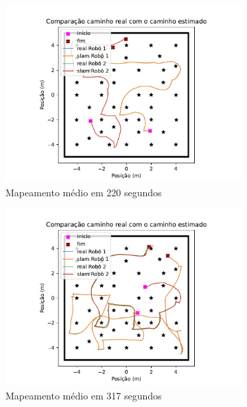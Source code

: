 \begin{figure}
  \begin{subfigure}{0.49\textwidth}
    \includegraphics[width=\textwidth]{figs/two-agents/robots-path-best-time.pdf} 
    \caption{Mapeamento médio em 220 segundos}
    \label{fig:two-agent-path-best}
  \end{subfigure}
  \begin{subfigure}{0.49\textwidth}
    \includegraphics[width=\textwidth]{figs/two-agents/robots-path-medium-low.pdf} 
    \caption{Mapeamento médio em 317 segundos}
    \label{fig:two-agente-path-medium-low}
  \end{subfigure}
  \begin{subfigure}{0.49\textwidth}

\end{subfigure}
\end{figure}
